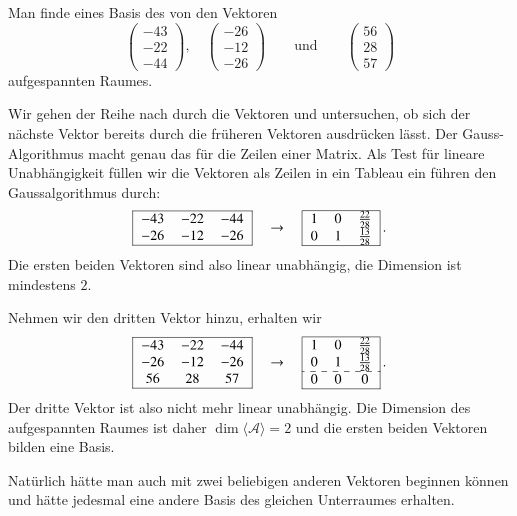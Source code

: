 \begin{beispiel}
Man finde eines Basis des von den Vektoren 
\[
\begin{pmatrix}
  -43\\  -22\\  -44
\end{pmatrix},\quad
\begin{pmatrix}
  -26\\  -12\\  -26
\end{pmatrix}
\qquad\text{und}\qquad
\begin{pmatrix}
   56\\   28\\   57
\end{pmatrix}
\]
aufgespannten Raumes.

\smallskip

{\parindent=0pt Wir} gehen der Reihe nach durch die Vektoren und untersuchen,
ob sich der nächste Vektor bereits durch die früheren Vektoren 
ausdrücken lässt.
Der Gauss-Algorithmus macht genau das für die Zeilen einer Matrix.
Als Test für lineare Unabhängigkeit
füllen wir die Vektoren als Zeilen in ein Tableau ein führen
den Gaussalgorithmus durch:
\[
\begin{tabular}{|>{$}c<{$}>{$}c<{$}>{$}c<{$}|}
\hline
  -43&  -22&  -44\\
  -26&  -12&  -26\\
\hline
\end{tabular}
\quad\rightarrow\quad
\begin{tabular}{|>{$}c<{$}>{$}c<{$}>{$}c<{$}|}
\hline
1&0&\frac{22}{28}\\
0&1&\frac{13}{28}\\
\hline
\end{tabular}\,.
\]
Die ersten beiden Vektoren sind also linear unabhängig, die Dimension
ist mindestens $2$.

Nehmen wir den dritten Vektor hinzu, erhalten wir
\[
\begin{tabular}{|>{$}c<{$}>{$}c<{$}>{$}c<{$}|}
\hline
  -43&  -22&  -44\\
  -26&  -12&  -26\\
   56&   28&   57\\
\hline
\end{tabular}
\quad\rightarrow\quad
\begin{tabular}{|>{$}c<{$}>{$}c<{$}>{$}c<{$}|}
\hline
1&0&\frac{22}{28}\\
0&1&\frac{13}{28}\\
\hdashline
0&0&0\\
\hline
\end{tabular}\,.
\]
Der dritte Vektor ist also nicht mehr linear unabhängig. 
Die Dimension des aufgespannten Raumes ist daher
$\dim\langle\mathcal{A}\rangle=2$ und die ersten
beiden Vektoren bilden eine Basis.

Natürlich hätte man auch mit zwei beliebigen anderen Vektoren
beginnen können und hätte jedesmal eine andere Basis des gleichen
Unterraumes erhalten.
\end{beispiel}


